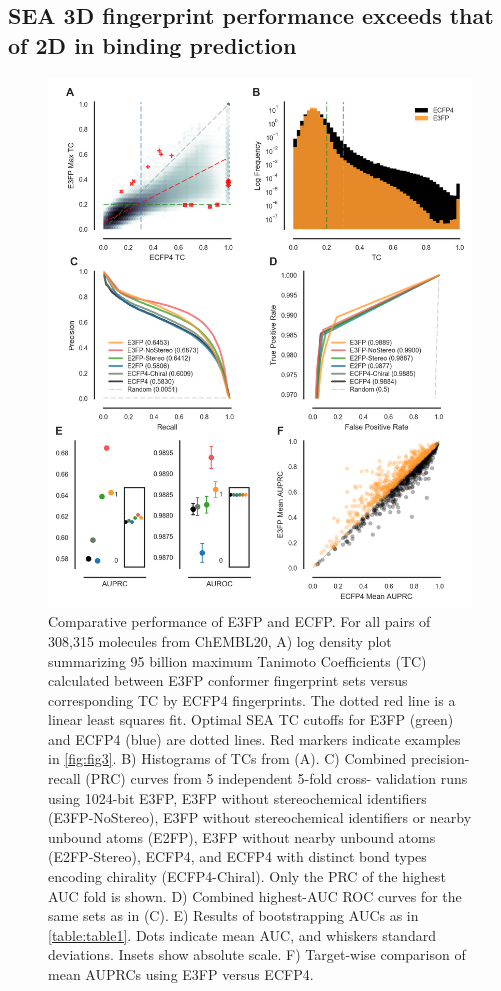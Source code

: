 \documentclass[../../main.tex]{subfiles}
\begin{document}
\begin{refsection}
	\subsection*{SEA 3D fingerprint performance exceeds that of 2D in binding prediction}

	\begin{figure}%
		\centering  \includegraphics[width=12.25cm]{fig2.png}
		\caption[Comparative performance of E3FP and ECFP]{
			Comparative performance of E3FP and ECFP.
			For all pairs of 308,315 molecules from ChEMBL20, A) log density plot summarizing 95 billion maximum Tanimoto Coefficients (TC) calculated between E3FP conformer fingerprint sets versus corresponding TC by ECFP4 fingerprints.
			The dotted red line is a linear least squares fit.
			Optimal SEA TC cutoffs for E3FP  (green) and ECFP4 (blue) are dotted lines.
			Red markers indicate examples in \cref{fig:fig3}.
			B) Histograms of TCs from (A).
			C) Combined precision-recall (PRC) curves from 5 independent 5-fold cross- validation runs using 1024-bit E3FP, E3FP without stereochemical identifiers (E3FP-NoStereo), E3FP without stereochemical identifiers or nearby unbound atoms  (E2FP), E3FP without nearby unbound atoms (E2FP-Stereo), ECFP4, and ECFP4 with distinct bond types encoding chirality  (ECFP4-Chiral).
			Only the PRC of the highest AUC fold is shown.
			D) Combined highest-AUC ROC curves for the same sets as in  (C).
			E) Results of bootstrapping AUCs as in \cref{table:table1}.
			Dots indicate mean AUC, and whiskers standard deviations.
			Insets show absolute scale.
			F) Target-wise comparison of mean AUPRCs using E3FP versus ECFP4.}
		\label{fig:fig2}
	\end{figure}


\end{refsection}
\end{document}
